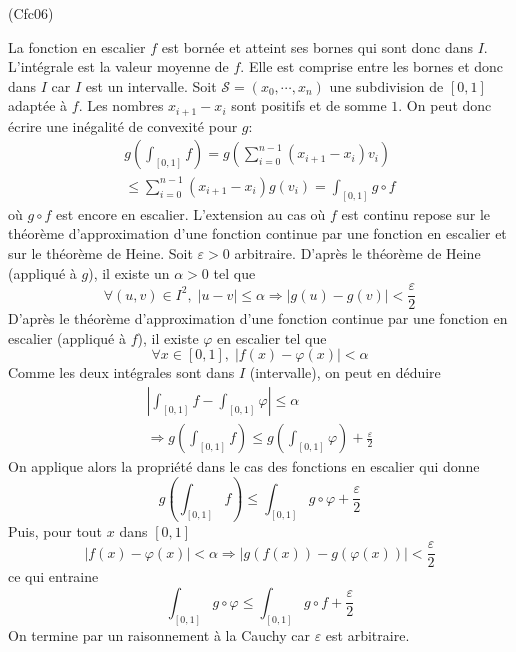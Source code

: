\begin{tiny}(Cfc06)\end{tiny} La fonction en escalier $f$ est bornée et atteint ses bornes qui sont donc dans $I$. L'intégrale est la valeur moyenne de $f$. Elle est comprise entre les bornes et donc dans $I$ car $I$ est un intervalle.\newline
Soit $\mathcal{S}=(x_0,\cdots,x_n)$ une subdivision de $[0,1]$ adaptée à $f$. Les nombres $x_{i+1}-x_i$ sont positifs et de somme $1$. On peut donc écrire une inégalité de convexité pour $g$:
\begin{multline*}
 g\left( \int_{[0,1]}f\right) =g\left(\sum_{i=0}^{n-1}(x_{i+1}-x_i)v_i \right)\\
\leq  \sum_{i=0}^{n-1}(x_{i+1}-x_i)g(v_i)
= \int_{[0,1]}g\circ f
\end{multline*}
 où $g\circ f$ est encore en escalier.\newline
L'extension au cas où $f$ est continu repose sur le théorème d'approximation d'une fonction continue par une fonction en escalier et sur le théorème de Heine.\newline
Soit $\varepsilon>0$ arbitraire. D'après le théorème de Heine (appliqué à $g$), il existe un $\alpha>0$ tel que 
\begin{displaymath}
 \forall (u,v)\in I^2,\; |u-v|\leq\alpha \Rightarrow
|g(u)-g(v)|<\frac{\varepsilon}{2}
\end{displaymath}
D'après le théorème d'approximation d'une fonction continue par une fonction en escalier (appliqué à $f$), il existe $\varphi$ en escalier tel que
\begin{displaymath}
 \forall x\in [0,1],\;|f(x)-\varphi(x)|<\alpha
\end{displaymath}
Comme les deux intégrales sont dans $I$ (intervalle), on peut en déduire
\begin{multline*}
 \left|\int_{[0,1]}f - \int_{[0,1]}\varphi \right|\leq \alpha \\
\Rightarrow g\left( \int_{[0,1]}f\right) \leq  g\left( \int_{[0,1]}\varphi\right) + \frac{\varepsilon}{2}
\end{multline*}
On applique alors la propriété dans le cas des fonctions en escalier qui donne
\begin{displaymath}
 g\left( \int_{[0,1]}f\right) \leq \int_{[0,1]}g\circ \varphi + \frac{\varepsilon}{2}
\end{displaymath}
Puis, pour tout $x$ dans $[0,1]$
\begin{displaymath}
 |f(x)-\varphi(x)|<\alpha \Rightarrow
|g(f(x))-g(\varphi(x))|<\frac{\varepsilon}{2}
\end{displaymath}
ce qui entraine
\begin{displaymath}
 \int_{[0,1]}g\circ \varphi \leq \int_{[0,1]}g\circ f + \frac{\varepsilon}{2}
\end{displaymath}
On termine par un raisonnement à la Cauchy car $\varepsilon$ est arbitraire.